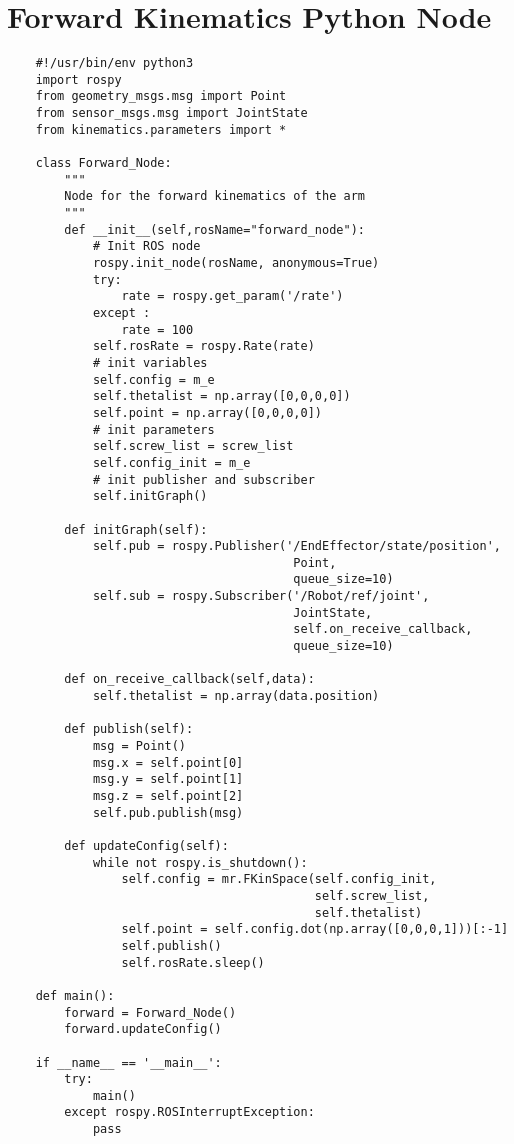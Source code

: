 \clearpage\section{Forward Kinematics Python Node}
\label{Forward_node}

\begin{verbatim}
    #!/usr/bin/env python3
    import rospy
    from geometry_msgs.msg import Point
    from sensor_msgs.msg import JointState
    from kinematics.parameters import *
    
    class Forward_Node:
        """
        Node for the forward kinematics of the arm
        """
        def __init__(self,rosName="forward_node"):
            # Init ROS node
            rospy.init_node(rosName, anonymous=True)
            try:
                rate = rospy.get_param('/rate')
            except :
                rate = 100
            self.rosRate = rospy.Rate(rate)
            # init variables
            self.config = m_e
            self.thetalist = np.array([0,0,0,0])
            self.point = np.array([0,0,0,0])
            # init parameters 
            self.screw_list = screw_list
            self.config_init = m_e
            # init publisher and subscriber
            self.initGraph()
    
        def initGraph(self):
            self.pub = rospy.Publisher('/EndEffector/state/position',
                                        Point,
                                        queue_size=10)
            self.sub = rospy.Subscriber('/Robot/ref/joint',
                                        JointState,
                                        self.on_receive_callback,
                                        queue_size=10)
    
        def on_receive_callback(self,data):
            self.thetalist = np.array(data.position)
            
        def publish(self):
            msg = Point()
            msg.x = self.point[0]
            msg.y = self.point[1]
            msg.z = self.point[2]
            self.pub.publish(msg)
    
        def updateConfig(self):
            while not rospy.is_shutdown():
                self.config = mr.FKinSpace(self.config_init,
                                           self.screw_list,
                                           self.thetalist)
                self.point = self.config.dot(np.array([0,0,0,1]))[:-1]
                self.publish()
                self.rosRate.sleep()
    
    def main():
        forward = Forward_Node()
        forward.updateConfig()
    
    if __name__ == '__main__':
        try:
            main()
        except rospy.ROSInterruptException:
            pass
\end{verbatim}